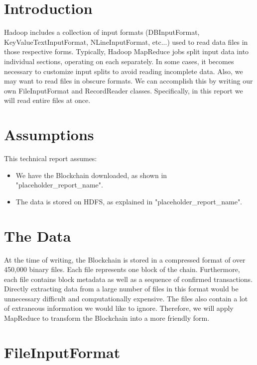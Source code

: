 \documentclass[9pt,twocolumn,twoside]{idsi}
\begin{document}
\makecoverpage

\maketitle

\section{Introduction}
Hadoop includes a collection of input formats (DBInputFormat, KeyValueTextInputFormat, NLineInputFormat, etc...) used to read data files in those respective forms. Typically, Hadoop MapReduce jobs split input data into individual sections, operating on each separately. In some cases, it becomes necessary to customize input splits to avoid reading incomplete data. Also, we may want to read files in obscure formats. We can accomplish this by writing our own FileInputFormat and RecordReader classes. Specifically, in this report we will read entire files at once.

\section{Assumptions}
This technical report assumes:
\begin{itemize}
    \item We have the Blockchain downloaded, as shown in "placeholder\_report\_name".
    \item The data is stored on HDFS, as explained in "placeholder\_report\_name".
\end{itemize}

\section{The Data}
At the time of writing, the Blockchain is stored in a compressed format of over 450,000 binary files. Each file represents one block of the chain. Furthermore, each file contains block metadata as well as a sequence of confirmed transactions. Directly extracting data from a large number of files in this format would be unnecessary difficult and computationally expensive. The files also contain a lot of extraneous information we would like to ignore. Therefore, we will apply MapReduce to transform the Blockchain into a more friendly form.
\section{FileInputFormat}
\end{document}
